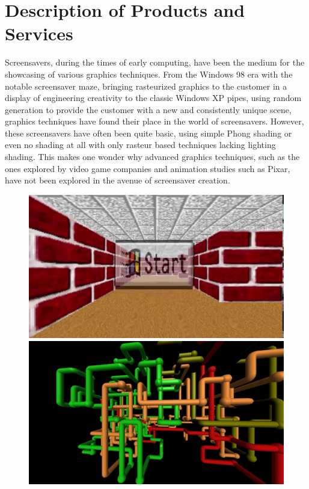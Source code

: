 \documentclass[10pt, openany]{book}
\begin{document}
\section{Description of Products and Services}

Screensavers, during the times of early computing, have been the medium for the showcasing of various graphics techniques. From the Windows 98 era with the notable screensaver maze, bringing rasteurized graphics to the customer in a display of engineering creativity to the classic Windows XP pipes, using random generation to provide the customer with a new and consistently unique scene, graphics techniques have found their place in the world of screensavers. However, these screensavers have often been quite basic, using simple Phong shading or even no shading at all with only rasteur based techniques lacking lighting shading. This makes one wonder why advanced graphics techniques, such as the ones explored by video game companies and animation studies such as Pixar, have not been explored in the avenue of screensaver creation. 

\begin{figure}[H]
\centering
\begin{minipage}{.5\textwidth}
  \centering
  \includegraphics[width=.8\linewidth]{maze}
\end{minipage}%
\begin{minipage}{.5\textwidth}
  \centering
  \includegraphics[width=.8\linewidth]{pipes}
\end{minipage}
\end{figure}	
\end{document}
